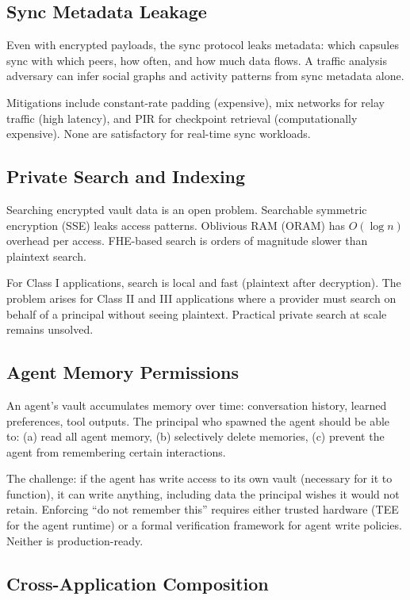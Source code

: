 \documentclass[11pt,a4paper]{article}
\begin{document}
\subsection{Sync Metadata Leakage}

Even with encrypted payloads, the sync protocol leaks metadata: which capsules
sync with which peers, how often, and how much data flows. A traffic analysis
adversary can infer social graphs and activity patterns from sync metadata
alone.

Mitigations include constant-rate padding (expensive), mix networks for relay
traffic (high latency), and PIR for checkpoint retrieval (computationally
expensive). None are satisfactory for real-time sync workloads.

\subsection{Private Search and Indexing}

Searching encrypted vault data is an open problem. Searchable symmetric
encryption (SSE) leaks access patterns. Oblivious RAM (ORAM) has
$O(\log n)$ overhead per access. FHE-based search is orders of magnitude
slower than plaintext search.

For Class I applications, search is local and fast (plaintext after
decryption). The problem arises for Class II and III applications where a
provider must search on behalf of a principal without seeing plaintext.
Practical private search at scale remains unsolved.

\subsection{Agent Memory Permissions}

An agent's vault accumulates memory over time: conversation history, learned
preferences, tool outputs. The principal who spawned the agent should be able
to: (a) read all agent memory, (b) selectively delete memories, (c) prevent
the agent from remembering certain interactions.

The challenge: if the agent has write access to its own vault (necessary for
it to function), it can write anything, including data the principal wishes
it would not retain. Enforcing ``do not remember this'' requires either
trusted hardware (TEE for the agent runtime) or a formal verification
framework for agent write policies. Neither is production-ready.

\subsection{Cross-Application Composition}
\end{document}
